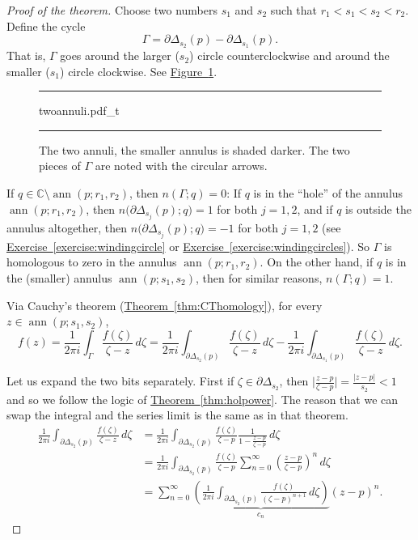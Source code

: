 \documentclass[12pt,openany]{book}
\newcommand{\ann}{\operatorname{ann}}
\newcommand{\sabs}[1]{\lvert {#1} \rvert}
\newcommand{\babs}[1]{\bigl\lvert {#1} \bigr\rvert}
\newcommand{\C}{{\mathbb{C}}}
\newcommand{\myquote}[1]{``#1''}
\theoremstyle{plain}
\theoremstyle{remark}
\theoremstyle{definition}
\newenvironment{myfig}{%
\begin{figure}[h!t]
\noindent\rule{\textwidth}{0.5pt}\vspace{12pt}\par\centering}%
{\par\noindent\rule{\textwidth}{0.5pt}
\end{figure}}
\theoremstyle{exercise}
\theoremstyle{example}
\newcommand{\figureref}[1]{\hyperref[#1]{Figure~\ref*{#1}}}
\newcommand{\exerciseref}[1]{\hyperref[#1]{Exercise~\ref*{#1}}}
\newcommand{\thmref}[1]{\hyperref[#1]{Theorem~\ref*{#1}}}
\begin{document}
\begin{proof}[Proof of the theorem]
Choose two numbers $s_1$ and $s_2$ such that $r_1 < s_1 < s_2 < r_2$.
Define the cycle
\begin{equation*}
\Gamma = \partial \Delta_{s_2}(p) - \partial \Delta_{s_1}(p) .
\end{equation*}
That is, $\Gamma$ goes around the larger ($s_2$) circle counterclockwise and
around the smaller ($s_1$) circle clockwise.
See \figureref{fig:twoannuli}.

\begin{myfig}
{twoannuli.pdf_t}
\caption{The two annuli, the smaller annulus is shaded darker.  The two
pieces of $\Gamma$ are noted with the circular arrows.\label{fig:twoannuli}}
\end{myfig}

If $q \in \C \setminus \ann(p;r_1,r_2)$, then $n(\Gamma;q) = 0$:
If $q$ is in the \myquote{hole} of the annulus $\ann(p;r_1,r_2)$, then
$n\bigl(\partial \Delta_{s_j}(p);q\bigr) = 1$ for both $j=1,2$, and 
if $q$ is outside the annulus altogether, then
$n\bigl(\partial \Delta_{s_j}(p);q\bigr) = -1$ for both $j=1,2$ 
(see \exerciseref{exercise:windingcircle} or
\exerciseref{exercise:windingcircles}).
So $\Gamma$ is homologous to zero in the annulus $\ann(p;r_1,r_2)$.
On the other hand, if $q$ is in the (smaller) annulus $\ann(p;s_1,s_2)$,
then for similar reasons, $n(\Gamma;q) = 1$.

Via Cauchy's theorem (\thmref{thm:CThomology}), for every $z \in \ann(p;s_1,s_2)$,
\begin{equation*}
f(z) = 
\frac{1}{2\pi i}
\int_{\Gamma} \frac{f(\zeta)}{\zeta-z} \, d\zeta 
=
\frac{1}{2\pi i}
\int_{\partial \Delta_{s_2}(p)} \frac{f(\zeta)}{\zeta-z} \, d\zeta 
-
\frac{1}{2\pi i}
\int_{\partial \Delta_{s_1}(p)} \frac{f(\zeta)}{\zeta-z} \, d\zeta  .
\end{equation*}

Let us expand the two bits separately.  First
if $\zeta \in \partial \Delta_{s_2}$, then
$\babs{\frac{z-p}{\zeta-p}} = \frac{\sabs{z-p}}{s_2} < 1$ and so
we follow the logic of \thmref{thm:holpower}.  The reason that we can
swap the integral and the series limit is the same as in that theorem.
\begin{equation*}
\begin{split}
\frac{1}{2\pi i}
\int_{\partial \Delta_{s_2}(p)} \frac{f(\zeta)}{\zeta-z} \, d\zeta 
& =
\frac{1}{2\pi i}
\int_{\partial \Delta_{s_2}(p)} \frac{f(\zeta)}{\zeta-p}
\frac{1}{1-\frac{z-p}{\zeta-p}} \, d\zeta
\\
& =
\frac{1}{2\pi i}
\int_{\partial \Delta_{s_2}(p)} \frac{f(\zeta)}{\zeta-p}
\sum_{n=0}^\infty
{\left(\frac{z-p}{\zeta-p}\right)}^n \, d\zeta
\\
& =
\sum_{n=0}^\infty
\underbrace{
\left(
\frac{1}{2\pi i}
\int_{\partial \Delta_{s_2}(p)} \frac{f(\zeta)}{{(\zeta-p)}^{n+1}}
 \, d\zeta
\right)
}_{c_n}
{(z-p)}^n .
\end{split}
\end{equation*}


\end{proof}
\end{document}
